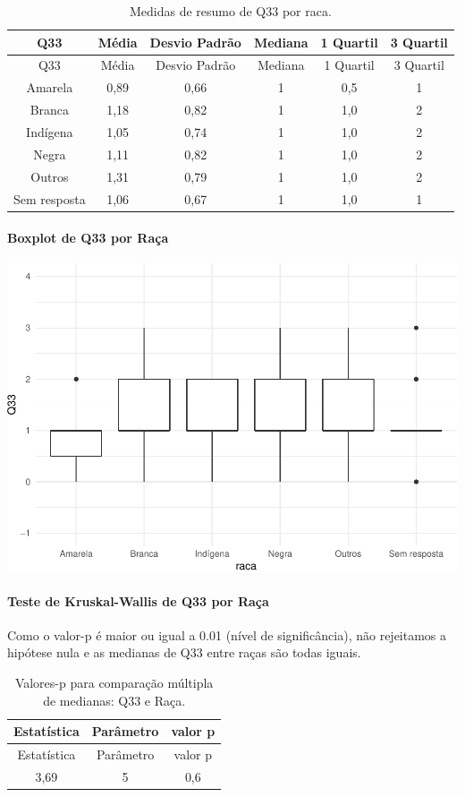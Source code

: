 \documentclass[]{article}
\let\oldparagraph\paragraph
\renewcommand{\paragraph}[1]{\oldparagraph{#1}\mbox{}}
\begin{document}
\begin{longtable}[]{@{}cccccc@{}}
\caption{\label{tab:unnamed-chunk-1167}Medidas de resumo de Q33 por raca.}\tabularnewline
\toprule
Q33 & Média & Desvio Padrão & Mediana & 1 Quartil & 3 Quartil\tabularnewline
\midrule
\endfirsthead
\toprule
Q33 & Média & Desvio Padrão & Mediana & 1 Quartil & 3 Quartil\tabularnewline
\midrule
\endhead
Amarela & 0,89 & 0,66 & 1 & 0,5 & 1\tabularnewline
Branca & 1,18 & 0,82 & 1 & 1,0 & 2\tabularnewline
Indígena & 1,05 & 0,74 & 1 & 1,0 & 2\tabularnewline
Negra & 1,11 & 0,82 & 1 & 1,0 & 2\tabularnewline
Outros & 1,31 & 0,79 & 1 & 1,0 & 2\tabularnewline
Sem resposta & 1,06 & 0,67 & 1 & 1,0 & 1\tabularnewline
\bottomrule
\end{longtable}

\hypertarget{boxplot-de-q33-por-rauxe7a}{%
\paragraph{Boxplot de Q33 por Raça}\label{boxplot-de-q33-por-rauxe7a}}

\begin{center}\includegraphics[width=0.75\linewidth]{relatorio_covid19_files/figure-latex/unnamed-chunk-1168-1} \end{center}

\hypertarget{teste-de-kruskal-wallis-de-q33-por-rauxe7a}{%
\paragraph{Teste de Kruskal-Wallis de Q33 por Raça}\label{teste-de-kruskal-wallis-de-q33-por-rauxe7a}}

Como o valor-p é maior ou igual a 0.01 (nível de significância), não rejeitamos a hipótese nula e as medianas de Q33 entre raças são todas iguais.

\begin{longtable}[]{@{}ccc@{}}
\caption{\label{tab:unnamed-chunk-1170}Valores-p para comparação múltipla de medianas: Q33 e Raça.}\tabularnewline
\toprule
Estatística & Parâmetro & valor p\tabularnewline
\midrule
\endfirsthead
\toprule
Estatística & Parâmetro & valor p\tabularnewline
\midrule
\endhead
3,69 & 5 & 0,6\tabularnewline
\bottomrule
\end{longtable}
\end{document}
